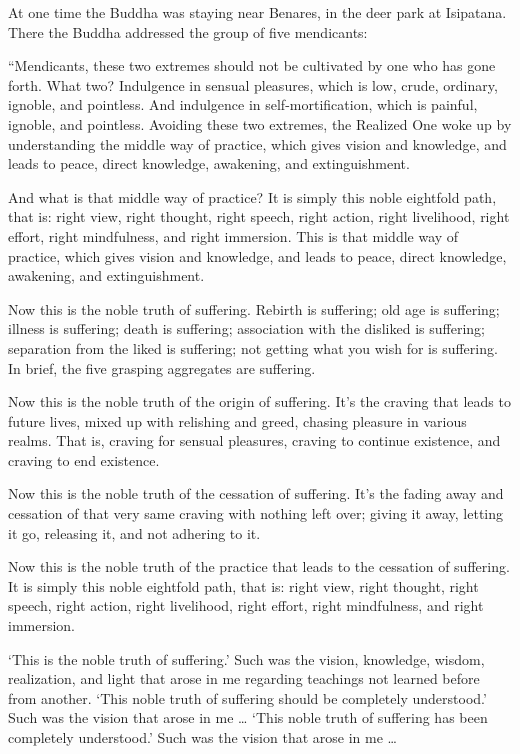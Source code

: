 \documentclass[12pt,openany]{book}%
\begin{document}
At one time the Buddha was staying near Benares, in the deer park at Isipatana. There the Buddha addressed the group of five mendicants: 

“Mendicants, these two extremes should not be cultivated by one who has gone forth. What two? Indulgence in sensual pleasures, which is low, crude, ordinary, ignoble, and pointless. And indulgence in self-mortification, which is painful, ignoble, and pointless. Avoiding these two extremes, the Realized One woke up by understanding the middle way of practice, which gives vision and knowledge, and leads to peace, direct knowledge, awakening, and extinguishment. 

And what is that middle way of practice? It is simply this noble eightfold path, that is: right view, right thought, right speech, right action, right livelihood, right effort, right mindfulness, and right immersion. This is that middle way of practice, which gives vision and knowledge, and leads to peace, direct knowledge, awakening, and extinguishment. 

Now this is the noble truth of suffering. Rebirth is suffering; old age is suffering; illness is suffering; death is suffering; association with the disliked is suffering; separation from the liked is suffering; not getting what you wish for is suffering. In brief, the five grasping aggregates are suffering. 

Now this is the noble truth of the origin of suffering. It’s the craving that leads to future lives, mixed up with relishing and greed, chasing pleasure in various realms. That is, craving for sensual pleasures, craving to continue existence, and craving to end existence. 

Now this is the noble truth of the cessation of suffering. It’s the fading away and cessation of that very same craving with nothing left over; giving it away, letting it go, releasing it, and not adhering to it. 

Now this is the noble truth of the practice that leads to the cessation of suffering. It is simply this noble eightfold path, that is: right view, right thought, right speech, right action, right livelihood, right effort, right mindfulness, and right immersion. 

‘This is the noble truth of suffering.’ Such was the vision, knowledge, wisdom, realization, and light that arose in me regarding teachings not learned before from another. ‘This noble truth of suffering should be completely understood.’ Such was the vision that arose in me … ‘This noble truth of suffering has been completely understood.’ Such was the vision that arose in me … 
\end{document}
